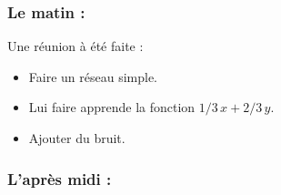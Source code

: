 \subsubsection*{Le matin :}
Une réunion à été faite :
\begin{itemize}
    \item Faire un réseau simple.
    \item Lui faire apprende la fonction $1/3\, x + 2/3\, y$.
    \item Ajouter du bruit.
\end{itemize}

\subsubsection*{L'après midi :}

